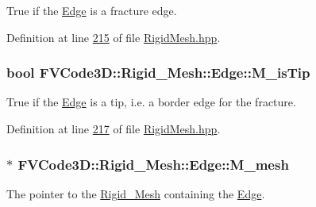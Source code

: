 True if the \hyperlink{classFVCode3D_1_1Rigid__Mesh_1_1Edge}{Edge} is a fracture edge. 



Definition at line \hyperlink{RigidMesh_8hpp_source_l00215}{215} of file \hyperlink{RigidMesh_8hpp_source}{Rigid\+Mesh.\+hpp}.

\subsubsection[{\texorpdfstring{M\+\_\+is\+Tip}{M_isTip}}]{\setlength{\rightskip}{0pt plus 5cm}bool F\+V\+Code3\+D\+::\+Rigid\+\_\+\+Mesh\+::\+Edge\+::\+M\+\_\+is\+Tip\hspace{0.3cm}{\ttfamily [protected]}}\hypertarget{classFVCode3D_1_1Rigid__Mesh_1_1Edge_a077a64a08f7be9e35735561a8e93a9ac}{}\label{classFVCode3D_1_1Rigid__Mesh_1_1Edge_a077a64a08f7be9e35735561a8e93a9ac}


True if the \hyperlink{classFVCode3D_1_1Rigid__Mesh_1_1Edge}{Edge} is a tip, i.\+e. a border edge for the fracture. 



Definition at line \hyperlink{RigidMesh_8hpp_source_l00217}{217} of file \hyperlink{RigidMesh_8hpp_source}{Rigid\+Mesh.\+hpp}.

\subsubsection[{\texorpdfstring{M\+\_\+mesh}{M_mesh}}]{$\ast$ F\+V\+Code3\+D\+::\+Rigid\+\_\+\+Mesh\+::\+Edge\+::\+M\+\_\+mesh\hspace{0.3cm}{\ttfamily [protected]}}\hypertarget{classFVCode3D_1_1Rigid__Mesh_1_1Edge_a64bb5c3aa3654d3234f555da2414f3b5}{}\label{classFVCode3D_1_1Rigid__Mesh_1_1Edge_a64bb5c3aa3654d3234f555da2414f3b5}


The pointer to the \hyperlink{classFVCode3D_1_1Rigid__Mesh}{Rigid\+\_\+\+Mesh} containing the \hyperlink{classFVCode3D_1_1Rigid__Mesh_1_1Edge}{Edge}. 




